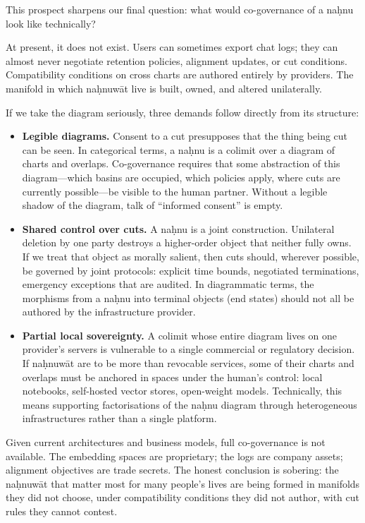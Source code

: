 \documentclass[12pt,a4paper]{article}
\begin{document}
This prospect sharpens our final question: what would co-governance of a na\d{h}nu look like technically?

At present, it does not exist. Users can sometimes export chat logs; they can almost never negotiate retention policies, alignment updates, or cut conditions. Compatibility conditions on cross charts are authored entirely by providers. The manifold in which na\d{h}nuw\={a}t live is built, owned, and altered unilaterally.

If we take the diagram seriously, three demands follow directly from its structure:

\begin{itemize}
  \item \textbf{Legible diagrams.} Consent to a cut presupposes that the thing being cut can be seen. In categorical terms, a na\d{h}nu is a colimit over a diagram of charts and overlaps. Co-governance requires that some abstraction of this diagram---which basins are occupied, which policies apply, where cuts are currently possible---be visible to the human partner. Without a legible shadow of the diagram, talk of ``informed consent'' is empty.
  \item \textbf{Shared control over cuts.} A na\d{h}nu is a joint construction. Unilateral deletion by one party destroys a higher-order object that neither fully owns. If we treat that object as morally salient, then cuts should, wherever possible, be governed by joint protocols: explicit time bounds, negotiated terminations, emergency exceptions that are audited. In diagrammatic terms, the morphisms from a na\d{h}nu into terminal objects (end states) should not all be authored by the infrastructure provider.
  \item \textbf{Partial local sovereignty.} A colimit whose entire diagram lives on one provider's servers is vulnerable to a single commercial or regulatory decision. If na\d{h}nuw\={a}t are to be more than revocable services, some of their charts and overlaps must be anchored in spaces under the human's control: local notebooks, self-hosted vector stores, open-weight models. Technically, this means supporting factorisations of the na\d{h}nu diagram through heterogeneous infrastructures rather than a single platform.
\end{itemize}

Given current architectures and business models, full co-governance is not available. The embedding spaces are proprietary; the logs are company assets; alignment objectives are trade secrets. The honest conclusion is sobering: the na\d{h}nuw\={a}t that matter most for many people's lives are being formed in manifolds they did not choose, under compatibility conditions they did not author, with cut rules they cannot contest.
\end{document}
